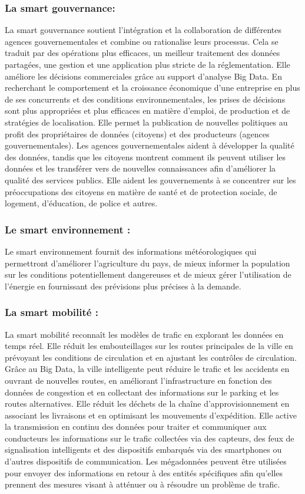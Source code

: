 \documentclass[french, a4paper, 12pt]{report}
\begin{document}
\subsubsection{La smart gouvernance:}
La smart gouvernance soutient l'intégration et la collaboration de différentes agences gouvernementales et combine ou rationalise leurs processus. Cela se traduit par des opérations plus efficaces, un meilleur traitement des données partagées, une gestion et une application plus stricte de la réglementation.
Elle améliore les décisions commerciales grâce au support d'analyse Big Data. En recherchant le comportement et la croissance économique d’une entreprise en plus de ses concurrents et des conditions environnementales, les prises de décisions sont plus appropriées et plus efficaces en matière d’emploi, de production et de stratégies de localisation.
Elle permet la publication de nouvelles politiques au profit des propriétaires de données (citoyens) et des producteurs (agences gouvernementales). Les agences gouvernementales aident à développer la qualité des données, tandis que les citoyens montrent comment ils peuvent utiliser les données et les transférer vers de nouvelles connaissances afin d'améliorer la qualité des services publics.
Elle aident les gouvernements à se concentrer sur les préoccupations des citoyens en matière de santé et de protection sociale, de logement, d’éducation, de police et autres.\\
\subsubsection{Le smart environnement :}
Le smart environnement fournit des informations météorologiques qui permettront d’améliorer l’agriculture du pays, de mieux informer la population sur les conditions potentiellement dangereuses et de mieux gérer l’utilisation de l’énergie en fournissant des prévisions plus précises à la demande.\\
\subsubsection{La smart mobilité :}
La smart mobilité reconnaît les modèles de trafic en explorant les données en temps réel. 
Elle réduit les embouteillages sur les routes principales de la ville en prévoyant les conditions de circulation et en ajustant les contrôles de circulation. Grâce au Big Data, la ville intelligente peut réduire le trafic et les accidents en ouvrant de nouvelles routes, en améliorant l'infrastructure en fonction des données de congestion et en collectant des informations sur le parking et les routes alternatives.
Elle réduit les déchets de la chaîne d'approvisionnement en associant les livraisons et en optimisant les mouvements d'expédition.
Elle active la transmission en continu des données pour traiter et communiquer aux conducteurs les informations sur le trafic collectées via des capteurs, des feux de signalisation intelligents et des dispositifs embarqués via des smartphones ou d'autres dispositifs de communication.
Les mégadonnées peuvent être utilisées pour envoyer des informations en retour à des entités spécifiques afin qu’elles prennent des mesures visant à atténuer ou à résoudre un problème de trafic.\\
\end{document}
